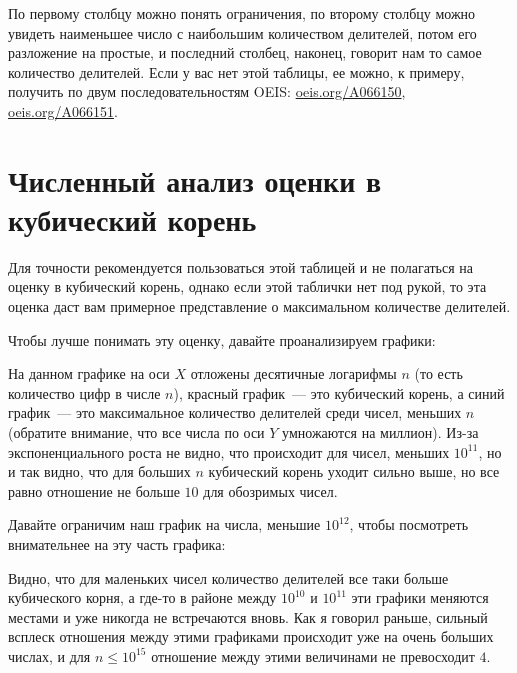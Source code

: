 По первому столбцу можно понять ограничения, по второму столбцу можно увидеть наименьшее число с наибольшим количеством делителей, потом его разложение на простые, и последний столбец, наконец, говорит нам то самое количество делителей. Если у вас нет этой таблицы, ее можно, к примеру, получить по двум последовательностям OEIS: \href{http://oeis.org/A066150}{oeis.org/A066150}, \href{http://oeis.org/A066151}{oeis.org/A066151}.

\section{Численный анализ оценки в кубический корень}

Для точности рекомендуется пользоваться этой таблицей и не полагаться на оценку в кубический корень, однако если этой таблички нет под рукой, то эта оценка даст вам примерное представление о максимальном количестве делителей.

Чтобы лучше понимать эту оценку, давайте проанализируем графики:

\begin{center}    

\end{center}

На данном графике на оси $X$ отложены десятичные логарифмы $n$ (то есть количество цифр в числе $n$), красный график~--- это кубический корень, а синий график~--- это максимальное количество делителей среди чисел, меньших $n$ (обратите внимание, что все числа по оси $Y$ умножаются на миллион). Из-за экспоненциального роста не видно, что происходит для чисел, меньших $10^{11}$, но и так видно, что для больших $n$ кубический корень уходит сильно выше, но все равно отношение не больше $10$ для обозримых чисел.

Давайте ограничим наш график на числа, меньшие $10^{12}$, чтобы посмотреть внимательнее на эту часть графика:

\begin{center}    

\end{center}

Видно, что для маленьких чисел количество делителей все таки больше кубического корня, а где-то в районе между $10^{10}$ и $10^{11}$ эти графики меняются местами и уже никогда не встречаются вновь. Как я говорил раньше, сильный всплеск отношения между этими графиками происходит уже на очень больших числах, и для $n \le 10^{15}$ отношение между этими величинами не превосходит $4$.


